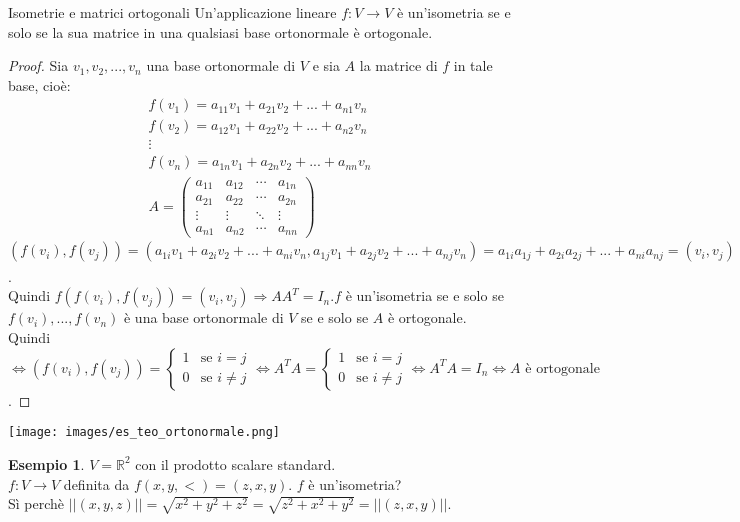 \documentclass[a4paper]{article}
\theoremstyle{definition}
\newtheorem*{es}{Esempio}
\begin{document}
	\begin{teo}{Isometrie e matrici ortogonali}
		Un'applicazione lineare $f: V \to V$ è un'isometria se e solo se la sua matrice in una qualsiasi base ortonormale è ortogonale.
	\end{teo}
	\begin{proof}
		Sia $v_1, v_2, ..., v_n$ una base ortonormale di $V$ e sia $A$ la matrice di $f$ in tale base, cioè:
		\begin{align*}
			f(v_1) = a_{11}v_1 + a_{21}v_2 + ... + a_{n1}v_n \\
			f(v_2) = a_{12}v_1 + a_{22}v_2 + ... + a_{n2}v_n \\
			\vdots \\
			f(v_n) = a_{1n}v_1 + a_{2n}v_2 + ... + a_{nn}v_n \\
			A = \begin{pmatrix}
				a_{11} & a_{12} & \cdots & a_{1n} \\
				a_{21} & a_{22} & \cdots & a_{2n} \\
				\vdots & \vdots & \ddots & \vdots \\
				a_{n1} & a_{n2} & \cdots & a_{nn}
			\end{pmatrix}
		\end{align*}
		$(f(v_i), f(v_j)) = (a_{1i}v_1 + a_{2i}v_2 + ... + a_{ni}v_n, a_{1j}v_1 + a_{2j}v_2 + ... + a_{nj}v_n) = a_{1i}a_{1j} + a_{2i}a_{2j} + ... + a_{ni}a_{nj} = (v_i, v_j) = (AA^T)_{ij}$. \\
		Quindi $f(f(v_i), f(v_j)) = (v_i, v_j) \Rightarrow AA^T = I_n. f$ è un'isometria se e solo se $f(v_i), ..., f(v_n)$ è una base ortonormale di $V$ se e solo se $A$ è ortogonale. \\
		Quindi $\Leftrightarrow (f(v_i), f(v_j)) = \begin{cases}
			1 & \text{se } i = j \\
			0 & \text{se } i \ne j
		\end{cases} \Leftrightarrow A^TA = \begin{cases}
			1 & \text{se } i = j \\
			0 & \text{se } i \ne j
		\end{cases} \Leftrightarrow A^TA = I_n \Leftrightarrow A \text{ è ortogonale}$.
	\end{proof}
	
	\begin{center}
		\texttt{[image: images/es\_teo\_ortonormale.png]}
	\end{center}
	\begin{es}
		$V = \mathbb{R}^2$ con il prodotto scalare standard. \\
		$f: V \to V$ definita da $f(x, y, <) = (z, x, y)$. $f$ è un'isometria? \\
		Sì perchè $||(x, y, z)|| = \sqrt{x^2 + y^2 + z^2} = \sqrt{z^2 + x^2 + y^2} = ||(z, x, y)||$.
	\end{es}
\end{document}
